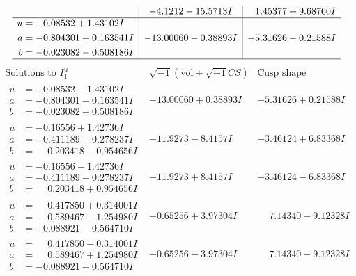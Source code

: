 \documentclass[1p]{elsarticle_modified}
\theoremstyle{definition}
\newcommand{\I}{\sqrt{-1}}
\begin{document}
$$\begin{array}{c|c|c}
 & -4.1212 - 15.5713 I & \phantom{-}1.45377 + 9.68760 I \\ \hline\begin{aligned}
u &= -0.08532 + 1.43102 I \\
a &= -0.804301 + 0.163541 I \\
b &= -0.023082 - 0.508186 I\end{aligned}
 & -13.00060 - 0.38893 I & -5.31626 - 0.21588 I\\
 \hline 
 \end{array}$$\newpage$$\begin{array}{c|c|c}  
\text{Solutions to }I^u_{1}& \I (\text{vol} + \sqrt{-1}CS) & \text{Cusp shape}\\
 \hline 
\begin{aligned}
u &= -0.08532 - 1.43102 I \\
a &= -0.804301 - 0.163541 I \\
b &= -0.023082 + 0.508186 I\end{aligned}
 & -13.00060 + 0.38893 I & -5.31626 + 0.21588 I \\ \hline\begin{aligned}
u &= -0.16556 + 1.42736 I \\
a &= -0.411189 + 0.278237 I \\
b &= \phantom{-}0.203418 - 0.954656 I\end{aligned}
 & -11.9273 - 8.4157 I & -3.46124 + 6.83368 I \\ \hline\begin{aligned}
u &= -0.16556 - 1.42736 I \\
a &= -0.411189 - 0.278237 I \\
b &= \phantom{-}0.203418 + 0.954656 I\end{aligned}
 & -11.9273 + 8.4157 I & -3.46124 - 6.83368 I \\ \hline\begin{aligned}
u &= \phantom{-}0.417850 + 0.314001 I \\
a &= \phantom{-}0.589467 - 1.254980 I \\
b &= -0.088921 - 0.564710 I\end{aligned}
 & -0.65256 + 3.97304 I & \phantom{-}7.14340 - 9.12328 I \\ \hline\begin{aligned}
u &= \phantom{-}0.417850 - 0.314001 I \\
a &= \phantom{-}0.589467 + 1.254980 I \\
b &= -0.088921 + 0.564710 I\end{aligned}
 & -0.65256 - 3.97304 I & \phantom{-}7.14340 + 9.12328 I \\ \hline\begin{aligned}

\end{aligned}
\end{array}$$
\end{document}

